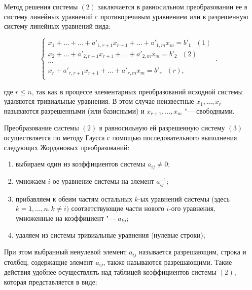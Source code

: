\documentclass[bachelor, och, labwork]{SCWorks}
\begin{document}
        Метод решения системы $(2)$ заключается в равносильном преобразовании
        ее в систему линейных уравнений с противоречивым уравнением или в
        разрешенную систему линейных уравнений вида:

        \begin{equation}
            \begin{cases}
                x_1 + \dots + \dots + a'_{1,r+1}x_{r+1} + \dots + a'_{1,m}x_{m} = b'_1 \text{ } (1)\\            
                x_2 + \dots + a'_{2,r+1}x_{r+1} + \dots + a'_{2,m}x_{m} = b'_2 \text{ }(2)\\            
                \cdots\\
                x_r + a'_{r,r+1}x_{r+1} + \dots + a'_{r,m}x_{m} = b'_r \text{ } (r),\\            
            \end{cases}\,.
        \end{equation}

        где $r \leq n$, так как в процессе элементарных преобразований исходной
        системы удаляются тривиальные уравнения. В этом случае неизвестные $x_1,
        \dots, x_r$ называются разрешенными (или базисными) и $x_{r + 1}, \dots,
        x_m$ "--- свободными.

        Преобразование системы $(2)$ в равносильную ей разрешенную систему $(3)$
        осуществляется по методу Гаусса с помощью последовательного выполнения
        следующих Жордановых преобразований:

        \begin{enumerate}
            \item выбираем один из коэффициентов системы $a_{ij} \neq 0$;
            \item умножаем $i$-ое уравнение системы на элемент $a^{-1}_{ij}$;
            \item прибавляем к обеим частям остальных $k$-ых уравнений системы
            (здесь $k = 1, \dots, n, k \neq i)$ соответствующие части нового
            $i$-ого уравнения, умноженные на коэффициент "--- $a_{kj}$;
            \item удаляем из системы тривиальные уравнения (нулевые строки);
        \end{enumerate}

        При этом выбранный ненулевой элемент $a_{ij}$ называется разрешающим,
        строка и столбец, содержащие элемент $a_{ij}$, также называются
        разрешающими. Такие действия удобнее осуществлять над таблицей
        коэффициентов системы $(2)$, которая представляется в виде:
\end{document}
